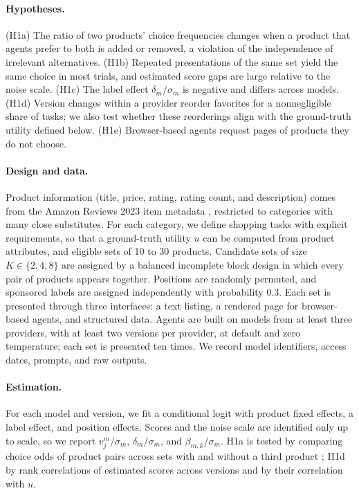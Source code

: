 \documentclass[opre,dblanonrev]{informs4}
\providecommand{\1}{\mathbf{1}}
\begin{document}
\paragraph{Hypotheses.} (H1a) The ratio of two products' choice frequencies changes when a product that agents prefer to both is added or removed, a violation of the independence of irrelevant alternatives. (H1b) Repeated presentations of the same set yield the same choice in most trials, and estimated score gaps are large relative to the noise scale. (H1c) The label effect $\delta_m/\sigma_m$ is negative and differs across models. (H1d) Version changes within a provider reorder favorites for a nonnegligible share of tasks; we also test whether these reorderings align with the ground-truth utility defined below. (H1e) Browser-based agents request pages of products they do not choose.

\paragraph{Design and data.} Product information (title, price, rating, rating count, and description) comes from the Amazon Reviews 2023 item metadata \citep{hou2024bridging}, restricted to categories with many close substitutes. For each category, we define shopping tasks with explicit requirements, so that a ground-truth utility $u$ can be computed from product attributes, and eligible sets of 10 to 30 products. Candidate sets of size $K\in\{2,4,8\}$ are assigned by a balanced incomplete block design in which every pair of products appears together. Positions are randomly permuted, and sponsored labels are assigned independently with probability $0.3$. Each set is presented through three interfaces: a text listing, a rendered page for browser-based agents, and structured data. Agents are built on models from at least three providers, with at least two versions per provider, at default and zero temperature; each set is presented ten times. We record model identifiers, access dates, prompts, and raw outputs.

\paragraph{Estimation.} For each model and version, we fit a conditional logit with product fixed effects, a label effect, and position effects. Scores and the noise scale are identified only up to scale, so we report $v_j^m/\sigma_m$, $\delta_m/\sigma_m$, and $\beta_{m,k}/\sigma_m$. H1a is tested by comparing choice odds of product pairs across sets with and without a third product \citep{hausman1984specification}; H1d by rank correlations of estimated scores across versions and by their correlation with $u$.
\end{document}

